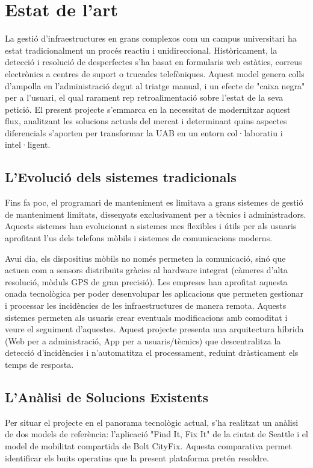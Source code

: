 \documentclass[10pt,a4paper,twocolumn,twoside]{article}
\begin{document}
		\section{Estat de l'art}
		La gestió d’infraestructures en grans complexos com un campus universitari ha estat tradicionalment un procés reactiu i unidireccional. Històricament, la detecció i resolució de desperfectes s'ha basat en formularis web estàtics, correus electrònics a centres de suport o trucades telefòniques. Aquest model genera colls d'ampolla en l'administració degut al triatge manual, i un efecte de "caixa negra" per a l'usuari, el qual rarament rep retroalimentació sobre l'estat de la seva petició. El present projecte s’emmarca en la necessitat de modernitzar aquest flux, analitzant les solucions actuals del mercat i determinant quins aspectes diferencials s'aporten per transformar la UAB en un entorn col·laboratiu i intel·ligent.
		
		\subsection{L'Evolució dels sistemes tradicionals}
		Fins fa poc, el programari de manteniment es limitava a grans sistemes de gestió de manteniment limitats, dissenyats exclusivament per a tècnics i administradors. Aquests sistemes han evolucionat a sistemes mes flexibles i útils per als usuaris aprofitant l'us dels telefons mòbils i sistemes de comunicacions moderns.
		
		Avui dia, els dispositius mòbils no només permeten la comunicació, sinó que actuen com a sensors distribuïts gràcies al hardware integrat (càmeres d'alta resolució, mòduls GPS de gran precisió). Les empreses han aprofitat aquesta onada tecnològica per poder desenvolupar les aplicacions que permeten gestionar i processar les incidències de les infraestructures de manera remota. Aquests sistemes permeten als usuaris crear eventuals modificacions amb comoditat i veure el seguiment d'aquestes. Aquest projecte presenta una arquitectura híbrida (Web per a administració, App per a usuaris/tècnics) que descentralitza la detecció d'incidències i n'automatitza el processament, reduint dràsticament els temps de resposta.
		
		\subsection{L'Anàlisi de Solucions Existents}
		Per situar el projecte en el panorama tecnològic actual, s’ha realitzat un anàlisi de dos models de referència: l'aplicació "Find It, Fix It" de la ciutat de Seattle i el model de mobilitat compartida de Bolt CityFix. Aquesta comparativa permet identificar els buits operatius que la present plataforma pretén resoldre.
		
\end{document}
